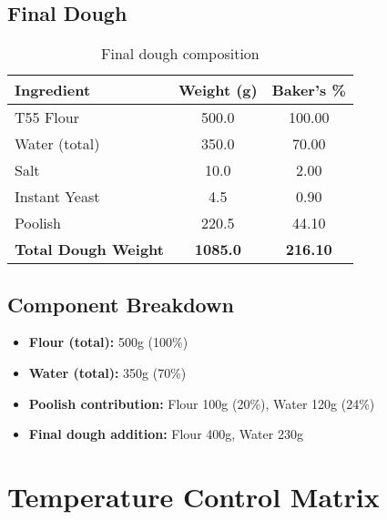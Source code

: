 \documentclass[10pt,a4paper]{article}
\begin{document}
    \subsection{Final Dough}
    \begin{table}[h]
        \centering
        \begin{tabular}{@{}lS[table-format=3.1]S[table-format=3.2]@{}}
            \toprule
            \textbf{Ingredient} & {\textbf{Weight (g)}} & {\textbf{Baker's \%}} \\
            \midrule
            T55 Flour & 500.0 & 100.00 \\
            Water (total) & 350.0 & 70.00 \\
            Salt & 10.0 & 2.00 \\
            Instant Yeast & 4.5 & 0.90 \\
            Poolish & 220.5 & 44.10 \\
            \midrule
            \textbf{Total Dough Weight} & \textbf{1085.0} & \textbf{216.10} \\
            \bottomrule
        \end{tabular}
        \caption{Final dough composition}
    \end{table}

    \subsection{Component Breakdown}
    \begin{itemize}[leftmargin=*]
        \item \textbf{Flour (total):} 500g (100\%)
        \item \textbf{Water (total):} 350g (70\%)
        \item \textbf{Poolish contribution:} Flour 100g (20\%), Water 120g (24\%)
        \item \textbf{Final dough addition:} Flour 400g, Water 230g
    \end{itemize}

    \section{Temperature Control Matrix}
\end{document}
